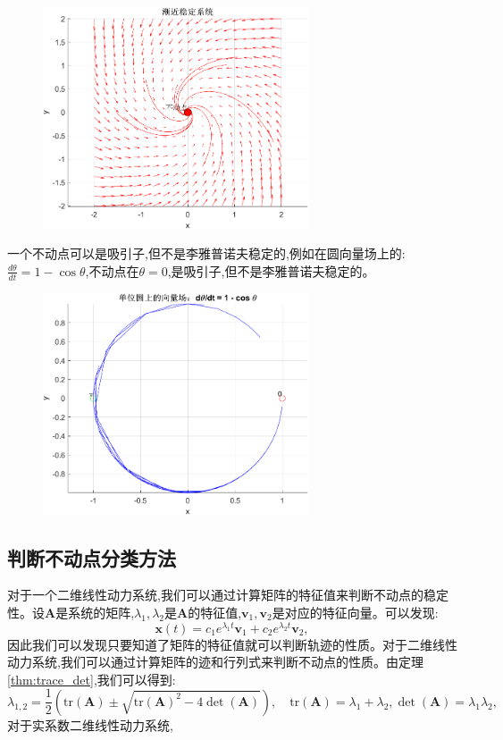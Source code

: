 \begin{figure}[H]
    \centering
    \includegraphics[width=0.7\textwidth]{Img/fix3.png}
    \label{fig:asymptotic_stable}
\end{figure}
一个不动点可以是吸引子,但不是李雅普诺夫稳定的,例如在圆向量场上的:$\frac{d\theta}{dt}=1-\cos\theta$,不动点在$\theta=0$,是吸引子,但不是李雅普诺夫稳定的。
\begin{figure}[H]
    \centering
    \includegraphics[width=0.7\textwidth]{Img/fix1.png}
    \label{fig:attractor}
\end{figure}
\subsection*{判断不动点分类方法}

对于一个二维线性动力系统,我们可以通过计算矩阵的特征值来判断不动点的稳定性。设$\mathbf{A}$是系统的矩阵,$\lambda_1,\lambda_2$是$\mathbf{A}$的特征值,$\mathbf{v}_1,\mathbf{v}_2$是对应的特征向量。可以发现:
\begin{equation}
    \mathbf{x}(t)=c_1e^{\lambda_1t}\mathbf{v}_1+c_2e^{\lambda_2t}\mathbf{v}_2,
\end{equation}
因此我们可以发现只要知道了矩阵的特征值就可以判断轨迹的性质。对于二维线性动力系统,我们可以通过计算矩阵的迹和行列式来判断不动点的性质。由定理\ref{thm:trace_det},我们可以得到:
\begin{equation}
    \lambda_{1,2}=\frac{1}{2}\left(\text{tr}(\mathbf{A})\pm \sqrt{\text{tr}(\mathbf{A})^2-4\det(\mathbf{A})}\right),\quad \text{tr}(\mathbf{A})=\lambda_1+\lambda_2,\det(\mathbf{A})=\lambda_1\lambda_2,
\end{equation}
对于实系数二维线性动力系统,

